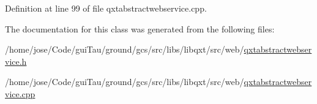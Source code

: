 Definition at line 99 of file qxtabstractwebservice.\-cpp.



The documentation for this class was generated from the following files\-:\begin{DoxyCompactItemize}
\item 
/home/jose/\-Code/gui\-Tau/ground/gcs/src/libs/libqxt/src/web/\hyperlink{qxtabstractwebservice_8h}{qxtabstractwebservice.\-h}\item 
/home/jose/\-Code/gui\-Tau/ground/gcs/src/libs/libqxt/src/web/\hyperlink{qxtabstractwebservice_8cpp}{qxtabstractwebservice.\-cpp}\end{DoxyCompactItemize}
